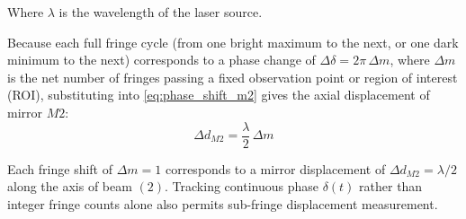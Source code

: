 Where $\lambda$ is the wavelength of the laser source.


Because each full fringe cycle (from one bright maximum to the next, or one dark minimum to the next) corresponds to a phase change of $\Delta\delta = 2\pi\,\Delta m$, where $\Delta m$ is the net number of fringes passing a fixed observation point or region of interest (ROI), substituting into \cref{eq:phase_shift_m2} gives the axial displacement of mirror $M2$:
\begin{equation}
    \Delta d_{M2} = \frac{\lambda}{2}\,\Delta m
    \label{eq:displacement_m2}
\end{equation}


Each fringe shift of $\Delta m = 1$ corresponds to a mirror displacement of $\Delta d_{M2} = \lambda/2$ along the axis of beam $(2)$. Tracking continuous phase $\delta(t)$ rather than integer fringe counts alone also permits sub-fringe displacement measurement.